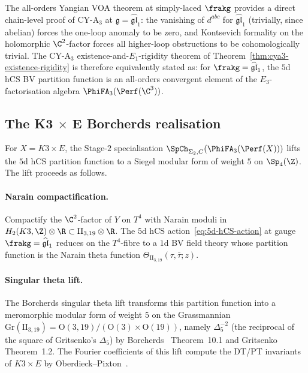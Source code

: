 The all-orders Yangian VOA theorem at simply-laced $\frakg$ provides
a direct chain-level proof of CY-A$_3$ at $\mathfrak{g} =
\widehat{\mathfrak{gl}}_1$: the vanishing of $d^{abc}$ for
$\widehat{\mathfrak{gl}}_1$ (trivially, since abelian) forces the
one-loop anomaly to be zero, and Kontsevich formality on the
holomorphic $\C^2$-factor forces all higher-loop obstructions to be
cohomologically trivial. The CY-A$_3$ existence-and-$E_1$-rigidity
theorem of Theorem~\ref{thm:cya3-existence-rigidity} is therefore
equivalently stated as: for $\frakg = \widehat{\mathfrak{gl}}_1$, the
$5$d hCS BV partition function is an all-orders convergent element of
the $E_3$-factorisation algebra $\PhiFA_3(\Perf(\C^3))$.

\subsection*{The K3 \texorpdfstring{$\times$}{x} E Borcherds realisation}

For $X = K3\times E$, the Stage-$2$ specialisation
$\SpCh_{\Sigma_2, C}(\PhiFA_3(\Perf(X)))$ lifts the $5$d hCS partition
function to a Siegel modular form of weight $5$ on $\Sp_4(\Z)$. The
lift proceeds as follows.

\paragraph{Narain compactification.}
Compactify the $\C^2$-factor of $Y$ on $T^4$ with Narain moduli in
$H_2(K3,\Z)\otimes\R \subset \mathrm{II}_{3,19}\otimes\R$. The
$5$d hCS action~\eqref{eq:5d-hCS-action} at gauge $\frakg =
\widehat{\mathfrak{gl}}_1$ reduces on the $T^4$-fibre to a
$1$d BV field theory whose partition function is the Narain theta
function $\Theta_{\mathrm{II}_{3,19}}(\tau, \bar\tau; z)$.

\paragraph{Singular theta lift.}
The Borcherds singular theta lift transforms this partition function
into a meromorphic modular form of weight $5$ on the Grassmannian
$\mathrm{Gr}(\mathrm{II}_{3,19}) = \mathrm{O}(3, 19)/(\mathrm{O}(3)\times
\mathrm{O}(19))$, namely $\Delta_5^{-2}$ (the reciprocal of the
square of Gritsenko's $\Delta_5$) by Borcherds~\cite{Borcherds1998}
Theorem~10.1 and Gritsenko~\cite{Gritsenko1999} Theorem~1.2. The
Fourier coefficients of this lift compute the DT/PT invariants of
$K3\times E$ by Oberdieck--Pixton~\cite{OberdieckPixton2018}.

